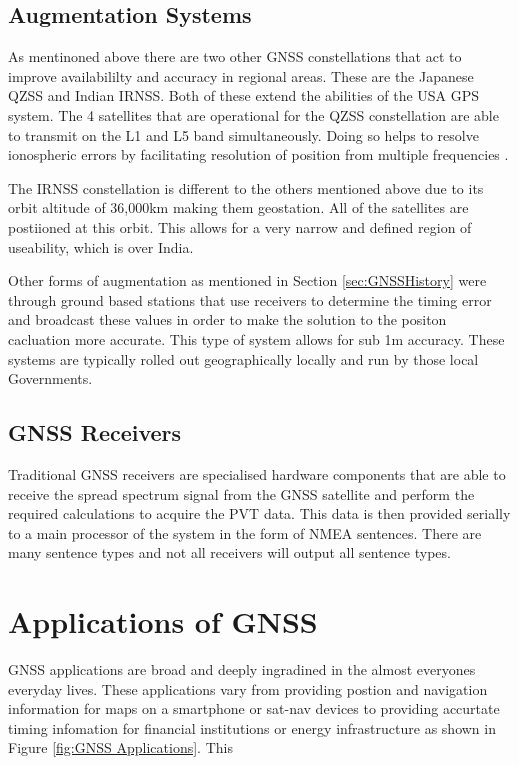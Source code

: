 \subsection{Augmentation Systems} \label{subsec:GNSS_OtherIntro}
As mentinoned above there are two other GNSS constellations that act to improve availabililty and accuracy in regional areas. These are the Japanese QZSS and Indian
IRNSS. Both of these extend the abilities of the USA GPS system. The 4 satellites that are operational for the QZSS constellation are able to transmit on the L1 and L5
band  simultaneously. Doing so helps to resolve ionospheric errors by facilitating resolution of position from multiple frequencies \cite{RN48}.

The IRNSS constellation is different to the others mentioned above due to its orbit altitude of 36,000km making them geostation. All of the satellites are postiioned at
this orbit. This allows for a very narrow and defined region of useability, which is over India. 

Other forms of augmentation as mentioned in Section \ref{sec:GNSSHistory} were through ground based stations that use receivers to determine the timing error and broadcast these
values in order to make the solution to the positon cacluation more accurate. This type of system allows for sub 1m accuracy. These systems are typically rolled out
geographically locally and run by those local Governments.

\subsection{GNSS Receivers}
Traditional GNSS receivers are specialised hardware components that are able to receive the spread spectrum signal from the GNSS satellite and perform the required
calculations to acquire the PVT data. This data is then provided serially to a main processor of the system in the form of NMEA sentences. There are many sentence types
and not all receivers will output all sentence types. 


\section{Applications of GNSS} \label{sec:ApplicationsGNSS}
GNSS applications are broad and deeply ingradined in the almost everyones everyday lives. These applications vary from providing postion and navigation information for
maps on a smartphone or sat-nav devices to providing accurtate timing infomation for financial institutions or energy infrastructure \cite{RN33} as shown in Figure
\ref{fig:GNSS Applications}. This 

